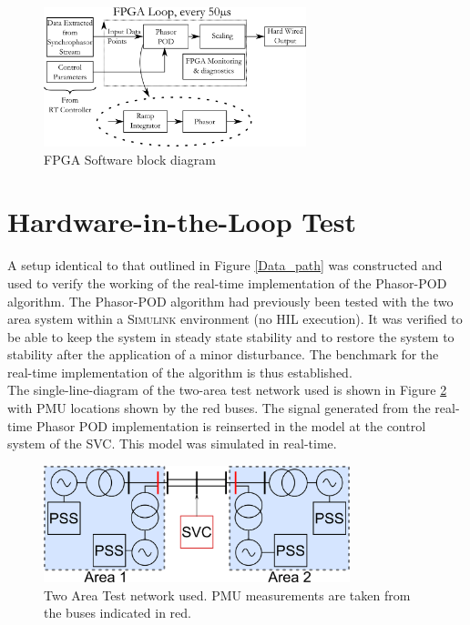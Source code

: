 \documentclass[conference]{IEEEtran}
\begin{document}
\begin{figure}[!t]
\centering
\includegraphics[width=3in]{FPGAOnly.png} 
\caption{FPGA Software block diagram}
\label{FPGA_Blocks}
\end{figure}

\section{Hardware-in-the-Loop Test} \label{HILtest}

A setup identical to that outlined in Figure \ref{Data_path} was constructed and used to verify the working of the real-time implementation of the Phasor-POD algorithm. The Phasor-POD algorithm had previously been tested with the two area system within a \textsc{Simulink} environment (no HIL execution). It was verified to be able to keep the system in steady state stability and to restore the system to stability after the application of a minor disturbance. The benchmark for the real-time implementation of the algorithm is thus established.\\

The single-line-diagram of the two-area test network used is shown in Figure \ref{Two_area} with PMU locations shown by the red buses. The signal generated from the real-time Phasor POD implementation is reinserted in the model at the control system of the SVC. This model was simulated in real-time.

\begin{figure}[!t]
\centering
\includegraphics[width=3.5in]{TwoArea.png} 
\caption{Two Area Test network used. PMU measurements are taken from the buses indicated in red.}
\label{Two_area}
\end{figure}
\end{document}

